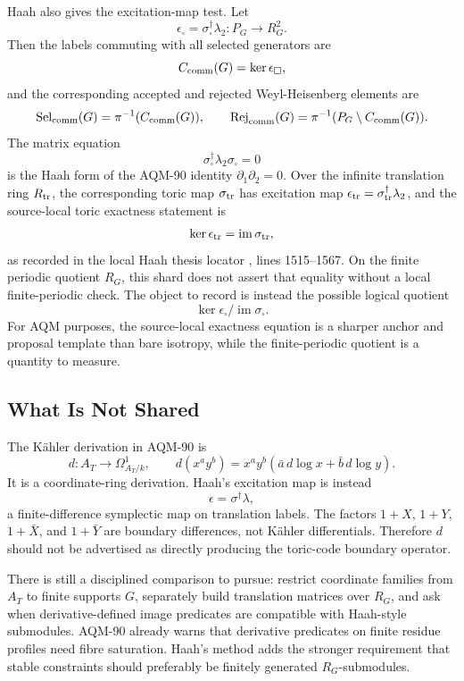 Haah also gives the excitation-map test.  Let
\[
  \epsilon_\square=\sigma_\square^\dagger\lambda_2:P_G\to R_G^2.
\]
Then the labels commuting with all selected generators are
\[
  C_{\rm comm}(G)=\ker\epsilon_\square,
\]
and the corresponding accepted and rejected Weyl-Heisenberg elements are
\[
  \operatorname{Sel}_{\rm comm}(G)=\pi^{-1}(C_{\rm comm}(G)),\qquad
  \operatorname{Rej}_{\rm comm}(G)=\pi^{-1}(P_G\setminus C_{\rm comm}(G)).
\]
The matrix equation
\[
  \sigma_\square^\dagger\lambda_2\sigma_\square=0
\]
is the Haah form of the AQM-90 identity \(\partial_1\partial_2=0\).  Over the
infinite translation ring \(R_{\rm tr}\), the corresponding toric map
\(\sigma_{\rm tr}\) has excitation map
\(\epsilon_{\rm tr}=\sigma_{\rm tr}^\dagger\lambda_2\), and the source-local
toric exactness statement is
\[
  \ker\epsilon_{\rm tr}=\operatorname{im}\sigma_{\rm tr},
\]
as recorded in the local Haah thesis locator
,
lines 1515--1567.  On the finite periodic quotient \(R_G\), this shard does
not assert that equality without a local finite-periodic check.  The object to
record is instead the possible logical quotient
\[
  \ker\epsilon_\square/\operatorname{im}\sigma_\square .
\]
For AQM purposes, the source-local exactness equation is a sharper anchor and
proposal template than bare isotropy, while the finite-periodic quotient is a
quantity to measure.

\subsection{What Is Not Shared}

The Kähler derivation in AQM-90 is
\[
  d:A_T\to\Omega^1_{A_T/k},\qquad
  d(x^ay^b)=x^ay^b(\bar a\,d\log x+\bar b\,d\log y).
\]
It is a coordinate-ring derivation.  Haah's excitation map is instead
\[
  \epsilon=\sigma^\dagger\lambda,
\]
a finite-difference symplectic map on translation labels.  The factors
\(1+X\), \(1+Y\), \(1+\bar X\), and \(1+\bar Y\) are boundary differences, not
Kähler differentials.  Therefore \(d\) should not be advertised as directly
producing the toric-code boundary operator.

There is still a disciplined comparison to pursue: restrict coordinate
families from \(A_T\) to finite supports \(G\), separately build translation
matrices over \(R_G\), and ask when derivative-defined image predicates are
compatible with Haah-style submodules.  AQM-90 already warns that derivative
predicates on finite residue profiles need fibre saturation.  Haah's method
adds the stronger requirement that stable constraints should preferably be
finitely generated \(R_G\)-submodules.

